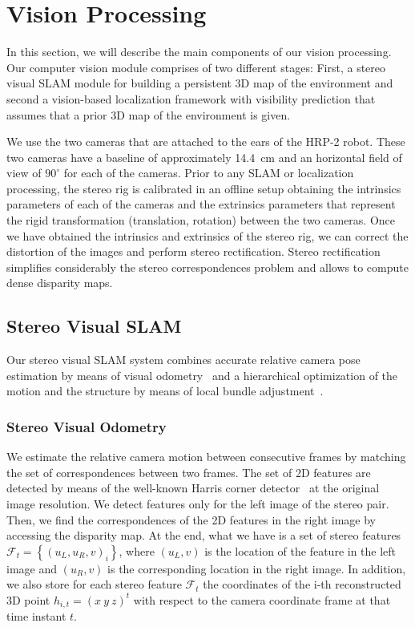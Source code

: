 
\section{Vision Processing}\label{sec:vision}
In this section, we will describe the main components of our vision processing. Our computer vision module comprises of two different stages: First, a stereo visual SLAM module for building a persistent 3D map of the environment and second a vision-based localization framework with visibility prediction that assumes that a prior 3D map of the environment is given. 

We use the two cameras that are attached to the ears of the HRP-2 robot. These two cameras have a baseline of approximately 14.4~cm and an horizontal field of view of $90^{\circ}$ for each of the cameras. Prior to any SLAM or localization processing, the stereo rig is calibrated in an offline setup obtaining the intrinsics parameters of each of the cameras and the extrinsics parameters that represent the rigid transformation (translation, rotation) between the two cameras. Once we have obtained the intrinsics and extrinsics of the stereo rig, we can correct the distortion of the images and perform stereo rectification. Stereo rectification simplifies considerably the stereo correspondences problem and allows to compute dense disparity maps.

\subsection{Stereo Visual SLAM}\label{sec:vslam}
Our stereo visual SLAM system combines accurate relative camera pose estimation by means of visual odometry~\cite{Kaess09icra} and a hierarchical optimization of the motion and the structure by means of
local bundle adjustment~\cite{Mouragnon09ivc}.

\subsubsection{Stereo Visual Odometry}\label{sec:visual_odometry}
We estimate the relative camera motion between consecutive frames by matching the set of correspondences between two frames. The set of 2D features are detected by means of the well-known Harris corner detector~\cite{Harris88avc} at the original image resolution. We detect features only for the left image of the stereo pair. Then, we find the correspondences of the 2D features in the right image by
accessing the disparity map. At the end, what we have is a set of stereo features
$\mathcal{F}_{t}=\left\{\left(u_{L},u_{R},v\right)_{i}\right\}$, where $\left(u_{L},v\right)$ is the location of the feature in the left image and $\left(u_{R},v\right)$ is the corresponding location in the
right image. In addition, we also store for each stereo feature $\mathcal{F}_{t}$ the coordinates of the i-th reconstructed 3D point $h_{i,t}=\left(x \ y \ z\right)^{t}$ with respect to the camera
coordinate frame at that time instant $t$.

